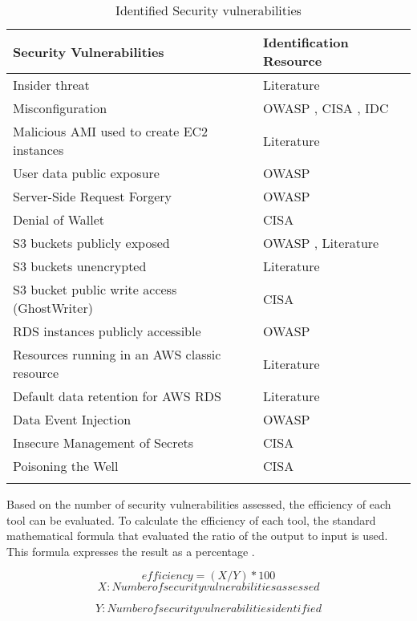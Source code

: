 \begin{longtable}{|p{9cm}|p{4.2cm}|}
    \hline
    \textbf{Security Vulnerabilities} & \textbf{Identification Resource}\\
    \hline
    Insider threat & Literature \cite{93} \\
    \hline
    Misconfiguration & OWASP \cite{51}, CISA \cite{52}, IDC \cite{53} \\
    \hline
    Malicious AMI used to create EC2 instances & Literature \cite{58} \\
    \hline
    User data public exposure & OWASP \cite{51} \\
    \hline
    Server-Side Request Forgery & OWASP \cite{51} \\
    \hline
    Denial of Wallet & CISA \cite{52} \\
    \hline
    S3 buckets publicly exposed & OWASP \cite{51}, Literature
    \cite{94}\\
    \hline
    S3 buckets unencrypted & Literature \cite{95}\\
    \hline
    S3 bucket public write access (GhostWriter) & CISA \cite{52} \\
    \hline
    RDS instances publicly accessible & OWASP \cite{51} \\
    \hline
    Resources running in an AWS classic resource &
    Literature \cite{96}\\
    \hline
    Default data retention for AWS RDS & Literature \cite{97} \\
    \hline
    Data Event Injection & OWASP \cite{51} \\
    \hline
    Insecure Management of Secrets & CISA \cite{52} \\
    \hline
    Poisoning the Well & CISA \cite{52} \\
    \hline
    \caption{Identified Security vulnerabilities}
    \label{tab:securityvulnerabilitiesandresources}
\end{longtable}

\par Based on the number of security vulnerabilities assessed, the efficiency of each tool can be evaluated.
To calculate the efficiency of each tool, the standard mathematical formula that evaluated the ratio of the output to input is used.
This formula expresses the result as a percentage \cite{98}.

\[ efficiency = (X/Y) * 100\]
\[  X: Number of security vulnerabilities assessed \]

\[  Y: Number of security vulnerabilities identified \]

